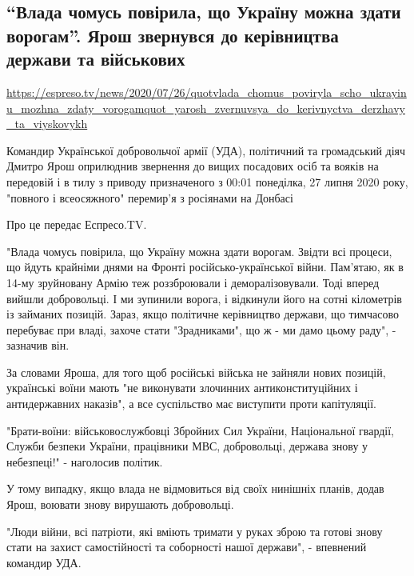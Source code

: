  
 
  
\subsection{``Влада чомусь повірила, що Україну можна здати ворогам''. Ярош звернувся до керівництва держави та військових}
\label{sec:26_07_2020.news.ua.1}
\url{https://espreso.tv/news/2020/07/26/quotvlada_chomus_poviryla_scho_ukrayinu_mozhna_zdaty_vorogamquot_yarosh_zvernuvsya_do_kerivnyctva_derzhavy_ta_viyskovykh}

  
Командир Української добровольчої армії (УДА), політичний та громадський діяч
Дмитро Ярош оприлюднив звернення до вищих посадових осіб та вояків на передовій
і в тилу з приводу призначеного з 00:01 понеділка, 27 липня 2020 року, "повного
і всеосяжного" перемир’я з росіянами на Донбасі 

Про це передає Еспресо.TV.

"Влада чомусь повірила, що Україну можна здати ворогам. Звідти всі процеси, що
йдуть крайніми днями на Фронті російсько-української війни. Пам’ятаю, як в
14-му зруйновану Армію теж роззброювали і деморалізовували. Тоді вперед вийшли
добровольці. І ми зупинили ворога, і відкинули його на сотні кілометрів із
займаних позицій. Зараз, якщо політичне керівництво держави, що тимчасово
перебуває при владі, захоче стати "Зрадниками", що ж - ми дамо цьому раду", -
зазначив він.

За словами Яроша, для того щоб російські війська не зайняли нових позицій,
українські воїни мають "не виконувати злочинних антиконституційних і
антидержавних наказів", а все суспільство має виступити проти капітуляції.

"Брати-воїни: військовослужбовці Збройних Сил України, Національної гвардії,
Служби безпеки України, працівники МВС, добровольці, держава знову у
небезпеці!" - наголосив політик.

У тому випадку, якщо влада не відмовиться від своїх нинішніх планів, додав
Ярош, воювати знову вирушають добровольці.

"Люди війни, всі патріоти, які вміють тримати у руках зброю та готові знову
стати на захист самостійності та соборності нашої держави", - впевнений
командир УДА.


